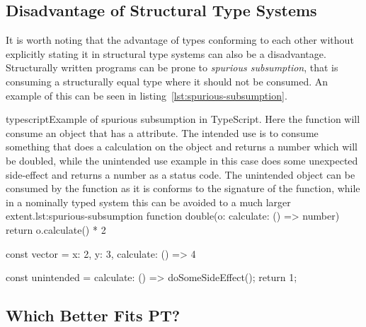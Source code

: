\subsection{Disadvantage of Structural Type Systems}\label{subsec:disadvantage-of-structural-type-systems}

It is worth noting that the advantage of types conforming to each other without explicitly stating it in structural type systems can also be a disadvantage.
Structurally written programs can be prone to \textit{spurious subsumption}, that is consuming a structurally equal type where it should not be consumed.
An example of this can be seen in listing~\vref{lst:spurious-subsumption}.

\begin{code}{typescript}{Example of spurious subsumption in TypeScript. Here the function  will consume an object that has a  attribute. The intended use is to consume something that does a calculation on the object and returns a number which will be doubled, while the unintended use example in this case does some unexpected side-effect and returns a number as a status code. The unintended object can be consumed by the  function as it is conforms to the signature of the function, while in a nominally typed system this can be avoided to a much larger extent.}{lst:spurious-subsumption}
    function double(o: {calculate: () => number}) {
        return o.calculate() * 2
    }

    const vector = {
        x: 2,
        y: 3,
        calculate: () => 4
    }

    const unintended = {
        calculate: () => {
            doSomeSideEffect();
            return 1;
        }
    }
\end{code}

%


\subsection{Which Better Fits PT?}\label{subsec:which-better-fits-pt?}

